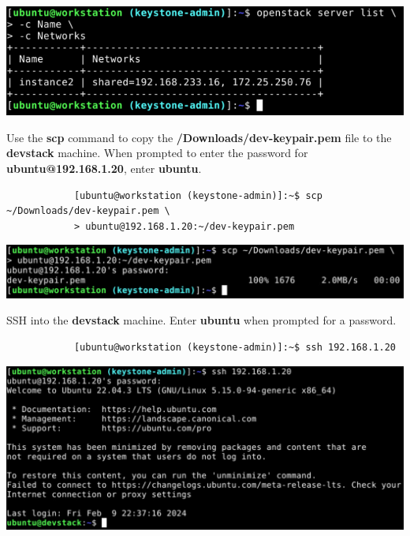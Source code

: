\documentclass[letterpaper, 12pt]{article}
\begin{document}
\begin{enumerate}
\begin{labstep}
        \begin{center}
            \includegraphics[width=\linewidth]{images/part3/step7.png}
        \end{center}
    \end{labstep}

    \begin{labstep}
        Use the \textbf{scp} command to copy the \textbf{\texttildemid/Downloads/dev-keypair.pem} file to the \textbf{devstack} machine.
        When prompted to enter the password for \textbf{ubuntu@192.168.1.20}, enter \textbf{ubuntu}.
        \begin{lstlisting}
            [ubuntu@workstation (keystone-admin)]:~$ scp ~/Downloads/dev-keypair.pem \
            > ubuntu@192.168.1.20:~/dev-keypair.pem
        \end{lstlisting}

        \begin{center}
            \includegraphics[width=\linewidth]{images/part3/step8.png}
        \end{center}
    \end{labstep}

    \begin{labstep}
        SSH into the \textbf{devstack} machine.
        Enter \textbf{ubuntu} when prompted for a password.
        \begin{lstlisting}
            [ubuntu@workstation (keystone-admin)]:~$ ssh 192.168.1.20
        \end{lstlisting}

        \begin{center}
            \includegraphics[width=\linewidth]{images/part3/step9.png}
        \end{center}
    \end{labstep}


\end{enumerate}
\end{document}
